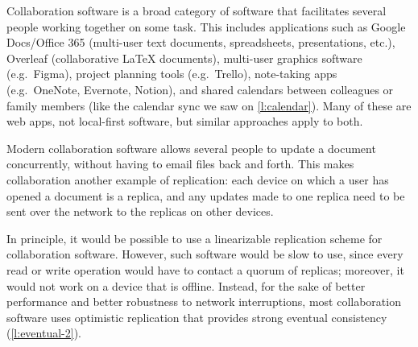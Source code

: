 Collaboration software is a broad category of software that facilitates several people working together on some task.
This includes applications such as Google Docs/Office 365 (multi-user text documents, spreadsheets, presentations, etc.), Overleaf (collaborative {\LaTeX} documents), multi-user graphics software (e.g.\ Figma), project planning tools (e.g.\ Trello), note-taking apps (e.g.\ OneNote, Evernote, Notion), and shared calendars between colleagues or family members (like the calendar sync we saw on \autoref{l:calendar}).
Many of these are web apps, not local-first software, but similar approaches apply to both.

Modern collaboration software allows several people to update a document concurrently, without having to email files back and forth.
This makes collaboration another example of replication: each device on which a user has opened a document is a replica, and any updates made to one replica need to be sent over the network to the replicas on other devices.

In principle, it would be possible to use a linearizable replication scheme for collaboration software.
However, such software would be slow to use, since every read or write operation would have to contact a quorum of replicas; moreover, it would not work on a device that is offline.
Instead, for the sake of better performance and better robustness to network interruptions, most collaboration software uses optimistic replication that provides strong eventual consistency (\autoref{l:eventual-2}).

